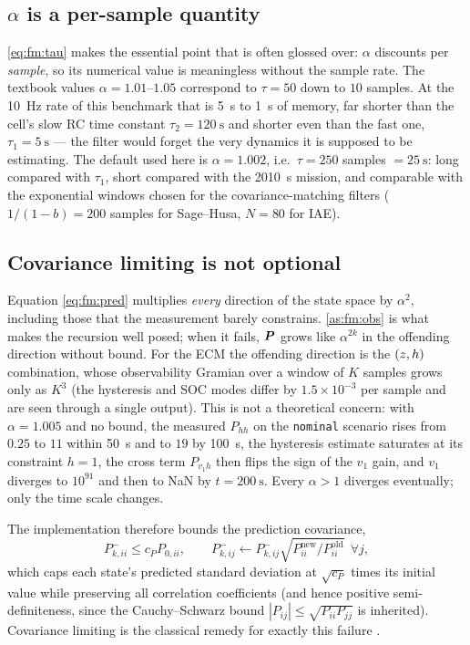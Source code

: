 \subsection{$\alpha$ is a per-sample quantity}
\eqref{eq:fm:tau} makes the essential point that is often glossed over: $\alpha$ discounts per
\emph{sample}, so its numerical value is meaningless without the sample rate.  The textbook values
$\alpha=1.01$--$1.05$ \cite[Sec.~7.4]{simon2006} correspond to $\tau=50$ down to $10$ samples.  At
the \SI{10}{\hertz} rate of this benchmark that is \SI{5}{\second} to \SI{1}{\second} of memory,
far shorter than the cell's slow RC time constant $\tau_2=\SI{120}{\second}$ and shorter even than
the fast one, $\tau_1=\SI{5}{\second}$ --- the filter would forget the very dynamics it is supposed
to be estimating.  The default used here is $\alpha=1.002$, i.e.\ $\tau=250$ samples
$=\SI{25}{\second}$: long compared with $\tau_1$, short compared with the \SI{2010}{\second} mission,
and comparable with the exponential windows chosen for the covariance-matching filters
($1/(1-b)=200$ samples for Sage--Husa, $N=80$ for IAE).

\subsection{Covariance limiting is not optional}
\label{sec:fm:cap}
Equation \eqref{eq:fm:pred} multiplies \emph{every} direction of the state space by $\alpha^2$,
including those that the measurement barely constrains.  \cref{as:fm:obs} is what makes the
recursion well posed; when it fails, $\bm{P}$ grows like $\alpha^{2k}$ in the offending direction
without bound.  For the ECM the offending direction is the $(z,h)$ combination, whose
observability Gramian over a window of $K$ samples grows only as $K^3$ (the hysteresis and SOC modes
differ by $1.5\times10^{-3}$ per sample and are seen through a single output).  This is not a
theoretical concern: with $\alpha=1.005$ and no bound, the measured $P_{hh}$ on the
\texttt{nominal} scenario rises from $0.25$ to $11$ within \SI{50}{\second} and to $19$ by
\SI{100}{\second}, the hysteresis estimate saturates at its constraint $h=1$, the cross term
$P_{v_1h}$ then flips the sign of the $v_1$ gain, and $v_1$ diverges to $10^{91}$ and then to NaN by
$t=\SI{200}{\second}$.  Every $\alpha>1$ diverges eventually; only the time scale changes.

The implementation therefore bounds the prediction covariance,
\begin{equation}
P^-_{k,ii}\le c_P P_{0,ii},\qquad
P^-_{k,ij}\gets P^-_{k,ij}\sqrt{P^{\text{new}}_{ii}/P^{\text{old}}_{ii}} \ \ \forall j ,
\label{eq:fm:cap}
\end{equation}
which caps each state's predicted standard deviation at $\sqrt{c_P}$ times its initial value while
preserving all correlation coefficients (and hence positive semi-definiteness, since the
Cauchy--Schwarz bound $|P_{ij}|\le\sqrt{P_{ii}P_{jj}}$ is inherited).  Covariance limiting is the
classical remedy for exactly this failure \cite[Sec.~4.4]{andersonmoore1979}\cite[Sec.~7.4]{simon2006}.

